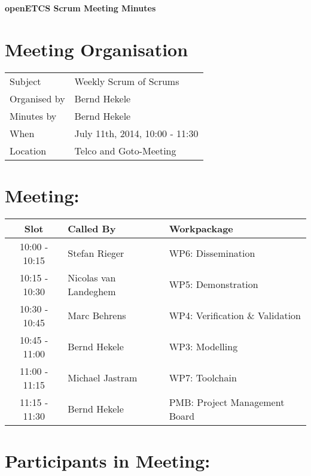 \documentclass[a4paper, 11pt]{article}
\begin{document}
{\begin{center}\huge\bf openETCS Scrum Meeting Minutes\end{center}}
\section{Meeting Organisation}

\renewcommand{\arraystretch}{1.5}
\begin{supertabular}{m{.2\textwidth}m{.8\textwidth}}
Subject & Weekly Scrum of Scrums\\
Organised by & Bernd Hekele\\
Minutes by & Bernd Hekele\\
When & July 11th, 2014, 10:00 - 11:30\\
Location & Telco and Goto-Meeting\\
\end{supertabular}

\renewcommand{\arraystretch}{1.0}
\section{Meeting:}

\begin{tabular}{|c|l|l|}
\hline
\textbf{Slot} &  \textbf{Called By} & \textbf{Workpackage} \\
\hline  
10:00 - 10:15 & Stefan Rieger & WP6: Dissemination \\\hline  
10:15 - 10:30 & Nicolas van Landeghem & WP5: Demonstration \\\hline  
10:30 - 10:45 & Marc Behrens & WP4: Verification \& Validation \\\hline  
10:45 - 11:00 & Bernd Hekele & WP3: Modelling \\\hline  
11:00 - 11:15 & Michael Jastram & WP7: Toolchain \\\hline
11:15 - 11:30 & Bernd Hekele & PMB: Project Management Board \\\hline  
\end{tabular}

\section{Participants in Meeting:}
\end{document}
